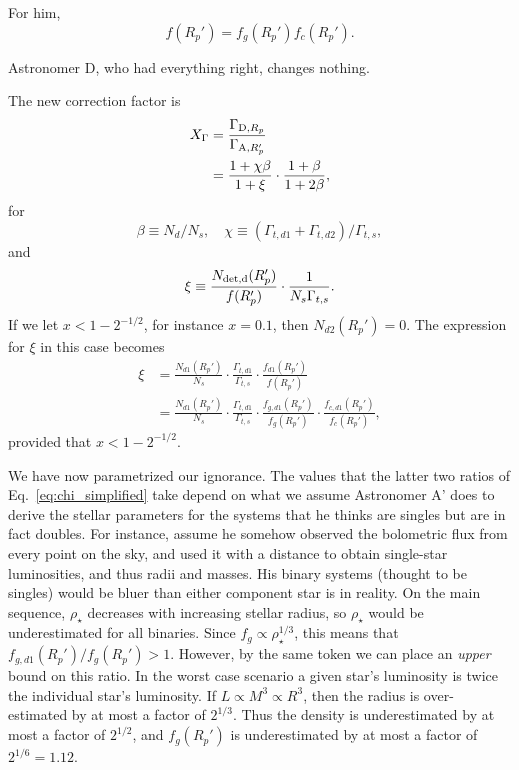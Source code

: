 \documentclass{emulateapj}
\begin{document}
For him,
\begin{equation}
f(R_p') = f_g(R_p') f_c(R_p').
\end{equation}

Astronomer D, who had everything right, changes nothing.

The new correction factor is
\begin{align}
X_\Gamma &= \frac{\Gamma_{{\rm D},R_p}}{\Gamma_{{\rm A},R_p'} } \\
&=
\frac{1+\chi \beta}{1 + \xi}  \cdot 
\frac{1 + \beta}{1 + 2\beta},
\end{align}
for
\begin{equation}
\beta \equiv N_d/N_s, \quad \chi \equiv (\Gamma_{t,d1} + 
\Gamma_{t,d2})/\Gamma_{t,s},
\end{equation}
and
\begin{equation}
\xi \equiv \frac{N_{\rm det,d}(R_p')}{f(R_p')} \cdot \frac{1}{N_s 
\Gamma_{t,s}}.
\end{equation}
If we let $x < 1 - 2^{-1/2}$, for instance $x=0.1$, then $N_{d2}(R_p') = 0$. 
The expression for $\xi$ in this case becomes
\begin{align}
\xi &= \frac{N_{d1}(R_p')}{N_s} \cdot \frac{\Gamma_{t,d1}}{\Gamma_{t,s}} \cdot 
\frac{f_{d1}(R_p')}{f(R_p')} \\
&= \frac{N_{d1}(R_p')}{N_s} \cdot \frac{\Gamma_{t,d1}}{\Gamma_{t,s}} \cdot 
\frac{f_{g,d1}(R_p')}{f_g(R_p')}\cdot \frac{f_{c,d1}(R_p')}{f_c(R_p')},
\label{eq:chi_simplified}
\end{align}
provided that $x < 1-2^{-1/2}$.

We have now parametrized our ignorance.
The values that the latter two ratios of Eq.~\ref{eq:chi_simplified} take 
depend on what we assume Astronomer A' does to derive the stellar parameters 
for the systems that he thinks are singles but are in fact doubles.
For instance, assume he somehow observed the bolometric flux from every point 
on the sky, and used it with a distance to obtain single-star luminosities, and 
thus radii and masses.
His binary systems (thought to be singles) would be bluer than either component 
star is in reality.
On the main sequence, $\rho_\star$ decreases with increasing stellar radius, 
so $\rho_\star$ would be underestimated for all binaries.
Since $f_g \propto \rho_\star^{1/3}$, this means that $f_{g,d1}(R_p')/f_g(R_p') 
> 1$.
However, by the same token we can place an \textit{upper} bound on this ratio. 
In the worst case scenario a given star's luminosity is twice the individual 
star's luminosity. If $L\propto M^3 \propto R^3$, then the radius is 
over-estimated by at most a factor of $2^{1/3}$. Thus the density is 
underestimated by at most a factor of $2^{1/2}$, and $f_g(R_p')$ is 
underestimated by at most a factor of $2^{1/6}=1.12$. 
\end{document}
